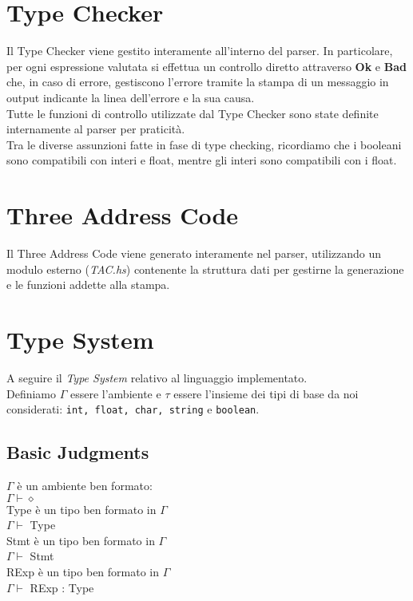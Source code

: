 \documentclass[12pt]{article}
\begin{document}
\pagebreak
\section*{Type Checker}
Il Type Checker viene gestito interamente all'interno del parser. In particolare, per ogni espressione valutata si effettua un controllo diretto attraverso \textbf{Ok} e \textbf{Bad} che, in caso di errore, gestiscono l'errore tramite la stampa di un messaggio in output indicante la linea dell'errore e la sua causa.\\
Tutte le funzioni di controllo utilizzate dal Type Checker sono state definite internamente al parser per praticità.\\
Tra le diverse assunzioni fatte in fase di type checking, ricordiamo che i booleani sono compatibili con interi e float, mentre gli interi sono compatibili con i float.

\section*{Three Address Code}
Il Three Address Code viene generato interamente nel parser, utilizzando un modulo esterno (\textit{TAC.hs}) contenente la struttura dati per gestirne la generazione e le funzioni addette alla stampa.

\section*{Type System}
A seguire il \textit{Type System} relativo al linguaggio implementato.\\
Definiamo $\Gamma$ essere l'ambiente e $\tau$ essere l'insieme dei tipi di base da noi considerati: \texttt{int, float, char, string} e \texttt{boolean}.

\subsection*{Basic Judgments}
\begin{center}
$\Gamma$ è un ambiente ben formato:\\
$\Gamma \vdash \diamond$\\[0.1in]
Type è un tipo ben formato in $\Gamma$\\
$\Gamma \vdash $ Type\\[0.1in]
Stmt è un tipo ben formato in $\Gamma$\\
$\Gamma \vdash $ Stmt\\[0.1in]
RExp è un tipo ben formato in $\Gamma$\\
$\Gamma \vdash $ RExp : Type\\[0.1in]
\end{center}
\end{document}
